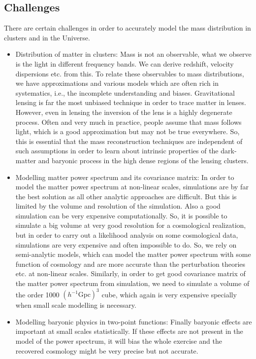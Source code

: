 \subsection{Challenges}

There are certain challenges in order to accurately model the mass distribution
in clusters and in the Universe. 

\begin{itemize}
	\item Distribution of matter in clusters: Mass is not an observable, what we 
			observe is the light in different frequency bands. We can derive 
			redshift, velocity dispersions etc. from this. To relate these observables
			to mass distributions, we have approximations and various models which
			are often rich in systematics, i.e., the incomplete understanding and 
			biases. Gravitational lensing is far the most unbiased technique in order
			to trace matter in lenses. However, even in lensing the inversion of the lens
			is a highly degenerate process. Often and very much in 
			practice, people assume that mass follows light, which is a good approximation
			but may not be true everywhere. So, this is essential that the 
			mass reconstruction techniques are independent of such assumptions in order
			to learn about intrinsic properties of the dark-matter and baryonic
			process in the high dense regions of the lensing clusters.

	\item Modelling matter power spectrum and its covariance matrix: In order to model
			the matter power spectrum at non-linear scales, simulations are by far the 
			best solution as all other analytic approaches are difficult. But this is limited
			by the volume and resolution of the simulation. Also a good simulation
			can be very expensive computationally. So, it is possible to simulate a big
			volume at very good resolution for a cosmological realization, but in order
			to carry out a likelihood analysis on some cosmological data, simulations are
			very expensive and often impossible to do. So, we rely on semi-analytic models, 
			which can model the matter power spectrum with some function of cosmology
			and are more accurate than the perturbation theories etc. at non-linear 
			scales. Similarly, in order to get good covariance matrix of the matter power
			spectrum from simulation, we need to simulate a volume of the order 
			1000 $(h^{-1} \mathrm{Gpc})^3$
			cube, which again is very expensive specially when small scale modelling 
			is necessary. 

	\item Modelling baryonic physics in two-point functions: Finally baryonic effects are 
			important at small scales statistically. If these effects are not present
			in the model of the power spectrum, it will bias the whole exercise and
			the recovered cosmology might be very precise but not accurate. 
\end{itemize}

